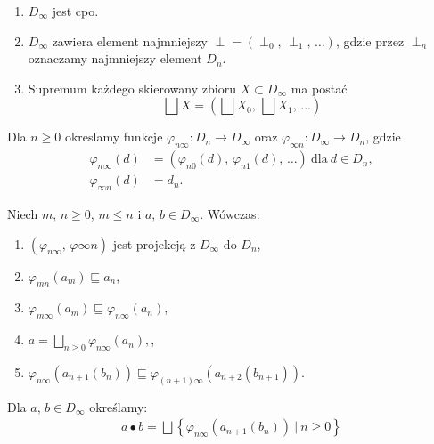 \begin{twierdzenie}%
\begin{enumerate}
\item \(D_\infty\) jest cpo.
\item \(D_\infty\) zawiera element najmniejszy \(\perp=(\perp_0,\,\perp_1,\,\dots)\), gdzie przez \(\perp_n\) oznaczamy najmniejszy element \(D_n\).
\item Supremum każdego skierowany zbioru \(X\subset D_\infty\) ma postać
\[
\bigsqcup X = (\bigsqcup X_0,\,\bigsqcup X_1,\,\dots)
\]
\end{enumerate}
\end{twierdzenie}

\begin{definicja}%
Dla \(n\geq 0\) okreslamy funkcje \(\varphi_{n\infty}:D_n\to D_\infty\) oraz \(\varphi_{\infty n}: D_\infty \to D_n\), gdzie 
\begin{align*}
\varphi_{n\infty}(d) &= (\varphi_{n0}(d),\,\varphi_{n1}(d),\,\dots)\ \text{dla}\ d\in D_n,\\
\varphi_{\infty n}(d) &= d_n.
\end{align*}
\end{definicja}

\begin{twierdzenie}%
Niech \(m,\,n\geq 0\), \(m\leq n\) i \(a,\,b\in D_\infty\). Wówczas:
\begin{enumerate}
\item \((\varphi_{n\infty},\,\varphi{\infty n})\) jest projekcją z \(D_\infty\) do \(D_n\),
\item \(\varphi_{mn}(a_m)\sqsubseteq a_n\),
\item \(\varphi_{m\infty}(a_m)\sqsubseteq \varphi_{n\infty}(a_n)\),
\item \(a=\bigsqcup_{n\geq 0}\varphi_{n\infty}(a_n),\),
\item \(\varphi_{n\infty}(a_{n+1}(b_n))\sqsubseteq\varphi_{(n+1)\infty}(a_{n+2}(b_{n+1}))\).
\end{enumerate}
\end{twierdzenie}

\begin{definicja}%
  Dla \(a,\,b\in D_\infty\) określamy:
\begin{align*}
a \bullet b = \bigsqcup\left\{\varphi_{n\infty}(a_{n+1}(b_n))\ |\ n\geq 0\right\}\tag{\textasteriskcentered}
\end{align*}
\end{definicja}

